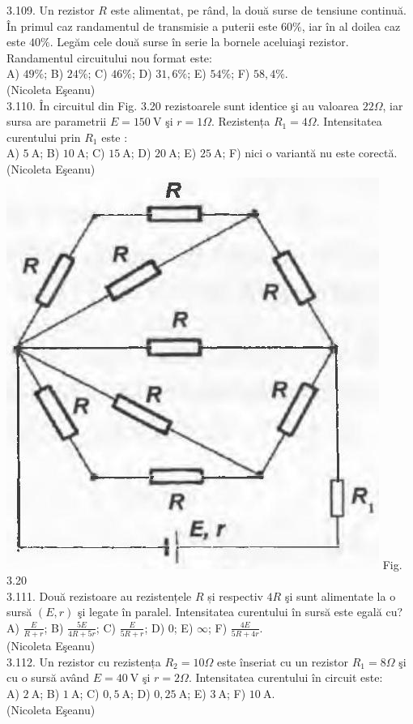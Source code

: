3.109. Un rezistor $R$ este alimentat, pe rând, la două surse de tensiune continuă. În primul caz randamentul de transmisie a puterii este $60 \%$, iar în al doilea caz este $40 \%$. Legăm cele două surse în serie la bornele aceluiaşi rezistor. Randamentul circuitului nou format este:\\ A) $49 \%$; B) $24 \%$; C) $46 \%$; D) $31,6 \%$; E) $54 \%$; F) $58,4 \%$.\\ (Nicoleta Eşeanu)\\

3.110. În circuitul din Fig. 3.20 rezistoarele sunt identice şi au valoarea $22 \Omega$, iar sursa are parametrii $E=150 \mathrm{~V}$ şi $r=1 \Omega$. Rezistența $R_{1}=4 \Omega$. Intensitatea curentului prin $R_{1}$ este :\\ A) $5 \mathrm{~A}$; B) $10 \mathrm{~A}$; C) $15 \mathrm{~A}$; D) $20 \mathrm{~A}$; E) $25 \mathrm{~A}$; F) nici o variantă nu este corectă.\\ (Nicoleta Eşeanu)\\ \includegraphics[width=0.4\linewidth]{images/2025_07_01_5b3ff9fa0d508c8e9f17g-167} Fig. 3.20\\

3.111. Două rezistoare au rezistențele $R$ și respectiv $4 R$ şi sunt alimentate la o sursă $(E, r)$ şi legate în paralel. Intensitatea curentului în sursă este egală cu?\\ A) $\frac{E}{R+r}$; B) $\frac{5 E}{4 R+5 r}$; C) $\frac{E}{5 R+r}$; D) 0; E) $\infty$; F) $\frac{4 E}{5 R+4 r}$.\\ (Nicoleta Eşeanu)\\

3.112. Un rezistor cu rezistența $R_{2}=10 \Omega$ este înseriat cu un rezistor $R_{1}=8 \Omega$ şi cu o sursă având $E=40 \mathrm{~V}$ şi $r=2 \Omega$. Intensitatea curentului în circuit este:\\ A) $2 \mathrm{~A}$; B) $1 \mathrm{~A}$; C) $0,5 \mathrm{~A}$; D) $0,25 \mathrm{~A}$; E) $3 \mathrm{~A}$; F) $10 \mathrm{~A}$.\\ (Nicoleta Eşeanu)\\

